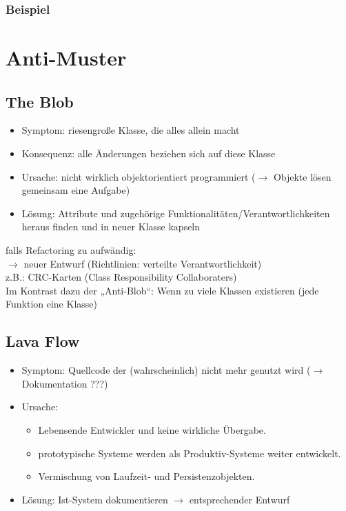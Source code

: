 \subsubsection*{Beispiel}

\section{Anti-Muster}

\subsection{The Blob}
\begin{itemize}
\item Symptom: riesengroße Klasse, die alles allein macht
\item Konsequenz: alle Änderungen beziehen sich auf diese Klasse
\item Ursache: nicht wirklich objektorientiert programmiert ($\to$ Objekte lösen gemeinsam eine Aufgabe)
\item Lösung: Attribute und zugehörige Funktionalitäten/Verantwortlichkeiten heraus finden und in neuer Klasse kapseln
\end{itemize}
falls Refactoring zu aufwändig:\\
$\to$ neuer Entwurf (Richtlinien: verteilte Verantwortlichkeit)\\
z.B.: CRC-Karten (Class Responsibility Collaboraters)\\
Im Kontrast dazu der „Anti-Blob“: Wenn zu viele Klassen existieren (jede Funktion eine Klasse)

\subsection{Lava Flow}
\begin{itemize}
\item Symptom: Quellcode der (wahrscheinlich) nicht mehr genutzt wird ($\to$ Dokumentation ???)
\item Ursache: 
\begin{itemize}
\item Lebensende Entwickler und keine wirkliche Übergabe.
\item prototypische Systeme werden als Produktiv-Systeme weiter entwickelt.
\item Vermischung von Laufzeit- und Persistenzobjekten.
\end{itemize}
\item Lösung: Ist-System dokumentieren $\to$ entsprechender Entwurf
\end{itemize}

